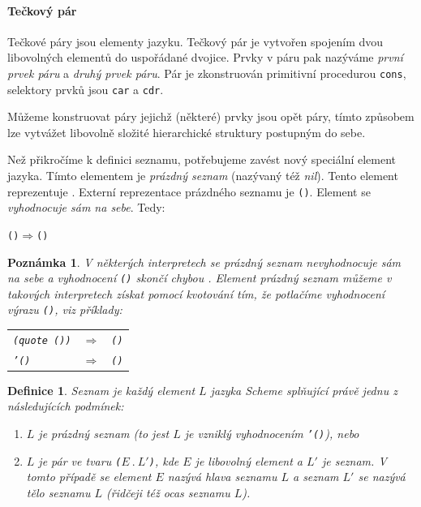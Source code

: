 \documentclass[10pt,a4paper]{article}
\newtheorem{definition}{Definice}
\newtheorem{note}{Poznámka}
\begin{document}
    \paragraph{Tečkový pár} Tečkové páry jsou elementy jazyku. Tečkový pár je vytvořen spojením dvou libovolných elementů do uspořádané dvojice. Prvky v páru pak nazýváme \textit{první prvek páru} a \textit{druhý prvek páru}. Pár je zkonstruován primitivní procedurou \texttt{cons}, selektory prvků jsou \texttt{car} a \texttt{cdr}. 
    
    Můžeme konstruovat páry jejichž (některé) prvky jsou opět páry, tímto způsobem lze vytvážet libovolně složité hierarchické struktury postupným  do sebe.
    
    Než přikročíme k definici seznamu, potřebujeme zavést nový speciální element jazyka. Tímto elementem je \textit{prázdný seznam} (nazývaný též \textit{nil}). Tento element reprezentuje . Externí reprezentace prázdného seznamu je \texttt{()}. Element  se \textit{vyhodnocuje sám na sebe}. Tedy:
    
    \texttt{()}\quad$\Rightarrow$\quad\texttt{()}
    
    \begin{note}
      V některých interpretech se prázdný seznam nevyhodnocuje sám na sebe a vyhodnocení \texttt{()} skončí chybou . Element \textit{prázdný seznam} můžeme v takových interpretech získat pomocí kvotování tím, že potlačíme vyhodnocení výrazu \texttt{()}, viz příklady:
      \begin{tabular}{l c l}
        \texttt{(quote ())} & $\Rightarrow$ & \texttt{()} \\
        \texttt{'()} & $\Rightarrow$ & \texttt{()}
      \end{tabular}
    \end{note}
    
    \begin{definition}
      \textit{Seznam} je každý element $L$ jazyka Scheme splňující právě jednu z následujících podmínek:
      \begin{enumerate}
        \item $L$ je prázdný seznam (to jest $L$ je vzniklý vyhodnocením \texttt{'()}), nebo
        \item $L$ je pár ve tvaru \texttt{(}$E\ .\ L'$\texttt{)}, kde $E$ je libovolný element a $L'$ je seznam. V tomto případě se element $E$ nazývá \textit{hlava seznamu $L$} a seznam $L'$ se nazývá \textit{tělo seznamu $L$} (řidčeji též \textit{ocas seznamu $L$}).
      \end{enumerate}
    \end{definition}
    
\end{document}

